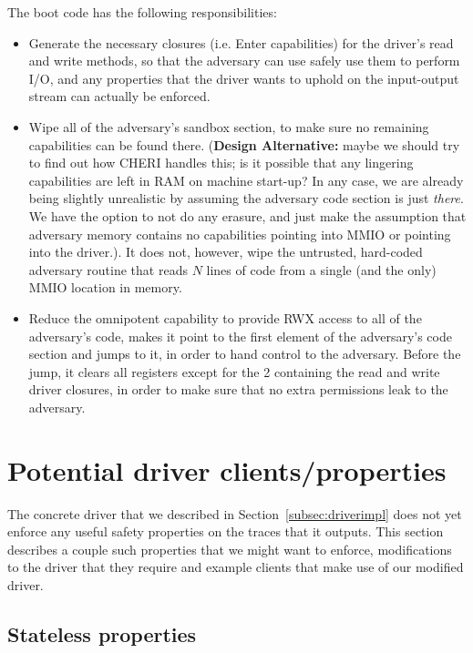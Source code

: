 \documentclass{article}
\begin{document}
The boot code has the following responsibilities:
\begin{itemize}
  \item Generate the necessary closures (i.e. Enter capabilities) for the
    driver's read and write methods, so that the adversary can use safely use
    them to perform I/O, and any properties that the driver wants to uphold on
    the input-output stream can actually be enforced.
%
  \item Wipe all of the adversary's sandbox section, to make sure no remaining
  capabilities can be found there.
    (\textbf{Design Alternative:} maybe we should try to find out how CHERI
    handles this; is it possible that any lingering capabilities are left in RAM
    on machine start-up? In any case, we are already being slightly unrealistic
    by assuming the adversary code section is just \emph{there}. We have the
    option to not do any erasure, and just make the assumption that adversary
    memory contains no capabilities pointing into MMIO or pointing into the
    driver.).
    It does not, however, wipe the untrusted, hard-coded adversary routine that
    reads $N$ lines of code from a single (and the only) MMIO location in
    memory.
%
  \item Reduce the omnipotent capability to provide RWX access to all of the
    adversary's code, makes it point to the first element of the adversary's
    code section and jumps to it, in order to hand control to the adversary.
    Before the jump, it clears all registers except for the 2 containing the
    read and write driver closures, in order to make sure that no extra
    permissions leak to the adversary.
\end{itemize}

\section{Potential driver clients/properties}
The concrete driver that we described in Section~\ref{subsec:driverimpl} does
not yet enforce any useful safety properties on the traces that it outputs. This
section describes a couple such properties that we might want to enforce,
modifications to the driver that they require and example clients that make use
of our modified driver.

\subsection{Stateless properties}
\end{document}
